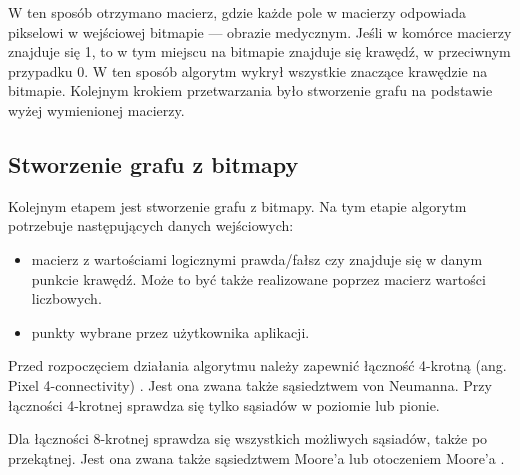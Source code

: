 \documentclass[a4paper,11pt,twoside,openright]{report}
\theoremstyle{definition}
\begin{document}
W ten sposób otrzymano macierz, gdzie każde pole w macierzy odpowiada pikselowi
w wejściowej bitmapie --- obrazie medycznym. Jeśli w komórce macierzy znajduje
się 1, to w tym miejscu na bitmapie znajduje się krawędź, w przeciwnym przypadku
0. W ten sposób algorytm wykrył wszystkie znaczące krawędzie na bitmapie. Kolejnym
krokiem przetwarzania było stworzenie grafu na podstawie wyżej wymienionej macierzy.

\subsection {Stworzenie grafu z bitmapy}

Kolejnym etapem jest stworzenie grafu z bitmapy. Na tym etapie algorytm potrzebuje
następujących danych wejściowych:
\begin{itemize}[noitemsep]
\item macierz z wartościami logicznymi prawda/fałsz czy znajduje się w danym
punkcie krawędź. Może to być także realizowane poprzez macierz wartości liczbowych.
\item punkty wybrane przez użytkownika aplikacji.
\end{itemize}

Przed rozpoczęciem działania algorytmu należy zapewnić łączność 4-krotną
(ang. Pixel 4-connectivity) \cite{Pixel connectivity}. Jest ona zwana także
sąsiedztwem von Neumanna. Przy łączności 4-krotnej sprawdza się tylko sąsiadów
w poziomie lub pionie.

\begin{center}
\end{center}

Dla łączności 8-krotnej sprawdza się wszystkich możliwych sąsiadów, także po
przekątnej. Jest ona zwana także sąsiedztwem Moore'a lub otoczeniem Moore'a \cite{Moore}.

\begin{center}
\end{center}
\end{document}
